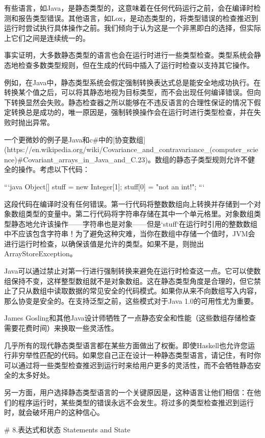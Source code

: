 \documentclass[cn,11pt,chinese]{elegantbook}
\begin{document}
{{{有些语言，如Java，是静态类型的，这意味着在任何代码运行之前，会在编译时检测和报告类型错误。其他语言，如Lox，是动态类型的，将类型错误的检查推迟到运行时尝试执行具体操作之前。我们倾向于认为这是一个非黑即白的选择，但实际上它们之间是连续统一的。

事实证明，大多数静态类型的语言也会在运行时进行一些类型检查。类型系统会静态地检查多数类型规则，但在生成的代码中插入了运行时检查以支持其它操作。

例如，在Java中，静态类型系统会假定强制转换表达式总是能安全地成功执行。在转换某个值之后，可以将其静态地视为目标类型，而不会出现任何编译错误。但向下转换显然会失败。静态检查器之所以能够在不违反语言的合理性保证的情况下假定转换总是成功的，唯一原因是，强制转换操作会在运行时进行类型检查，并在失败时抛出异常。

一个更微妙的例子是Java和c#中的[协变数组](https://en.wikipedia.org/wiki/Covariance_and_contravariance_(computer_science)#Covariant_arrays_in_Java_and_C.23)。数组的静态子类型规则允许不健全的操作。考虑以下代码：

```java
Object[] stuff = new Integer[1];
stuff[0] = "not an int!";
```

这段代码在编译时没有任何错误。第一行代码将整数数组向上转换并存储到一个对象数组类型的变量中。第二行代码将字符串存储在其中一个单元格里。对象数组类型静态地允许该操作——字符串也是对象——但是`stuff`在运行时引用的整数数组中不应该包含字符串！为了避免这种灾难，当你在数组中存储一个值时，JVM会进行运行时检查，以确保该值是允许的类型。如果不是，则抛出ArrayStoreException。

Java可以通过禁止对第一行进行强制转换来避免在运行时检查这一点。它可以使数组保持不变，这样整型数组就不是对象数组。这在静态类型角度是合理的，但它禁止了只从数组中读取数据的常见安全的代码模式。如果你从来不向数组写入内容，那么协变是安全的。在支持泛型之前，这些模式对于Java 1.0的可用性尤为重要。

James Gosling和其他Java设计师牺牲了一点静态安全和性能（这些数组存储检查需要花费时间）来换取一些灵活性。

几乎所有的现代静态类型语言都在某些方面做出了权衡。即使Haskell也允许您运行非穷举性匹配的代码。如果您自己正在设计一种静态类型语言，请记住，有时你可以通过将一些类型检查推迟到运行时来给用户更多的灵活性，而不会牺牲静态安全的太多好处。

另一方面，用户选择静态类型语言的一个关键原因是，这种语言让他们相信：在他们的程序运行时，某些类型的错误永远不会发生。将过多的类型检查推迟到运行时，就会破坏用户的这种信心。

# 8.表达式和状态 Statements and State

}}}
\end{document}
